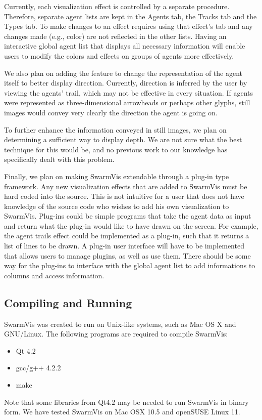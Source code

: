 \documentclass[conference]{IEEEtran}
\begin{document}
Currently, each visualization effect is controlled by a separate procedure.
Therefore, separate agent lists are kept in the Agents tab, the Tracks tab and the Types tab.
To make changes to an effect requires using that effect's tab and any changes made (e.g., color) are not reflected in the other lists.
Having an interactive global agent list that displays all necessary information will enable users to modify
the colors and effects on groups of agents more effectively. 

We also plan on adding the feature to change the representation of the agent itself to better display direction. Currently, direction is
inferred by the user by viewing the agents' trail, which may not be effective in every situation.
If agents were represented as three-dimensional arrowheads or perhaps other glyphs,
still images would convey very clearly the direction the agent is going on.

To further enhance the information conveyed in still images, we plan on determining a sufficient way to display depth.
We are not sure what the best technique for this would be, and no previous work to our knowledge has specifically dealt with this problem.

Finally, we plan on making SwarmVis extendable through a plug-in type framework. Any new visualization effects that are added
to SwarmVis must be hard coded into the source. This is not intuitive for a user that does not have knowledge of the source code
who wishes to add his own visualization to SwarmVis. Plug-ins could be simple programs that take the agent data as input and return
what the plug-in would like to have drawn on the screen. For example, the agent trails effect could be implemented as a plug-in, such
that it returns a list of lines to be drawn. A plug-in user interface will have to be implemented that allows users to manage plugins,
as well as use them. There should be some way for the plug-ins to interface with the global agent list to add informations to columns
and access information.






\subsection{Compiling and Running}
SwarmVis was created to run on Unix-like systems, such as Mac OS X and GNU/Linux.
The following programs are required to compile SwarmVis:
\begin{itemize}
\item Qt 4.2
\item gcc/g++ 4.2.2
\item make
\end{itemize}
Note that some libraries from Qt4.2 may be needed to run SwarmVis in binary form.
We have tested SwarmVis on Mac OSX 10.5 and openSUSE Linux 11.
\end{document}
